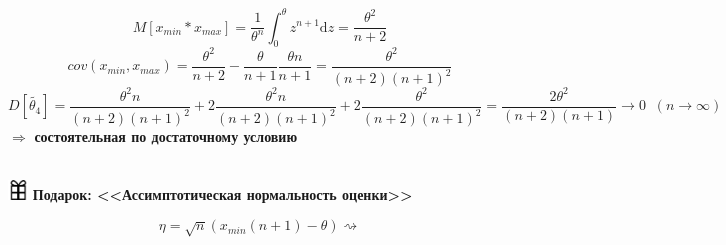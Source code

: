 \begin{equation*}  
    M\left[x_{min}*x_{max}\right]  = \frac{1}{\theta^n}\int_{0}^{\theta}z^{n+1}\mathrm{d}z
    = \frac{\theta^2}{n+2}
\end{equation*}
\vspace{1.5mm}
\begin{equation*}  
    cov(x_{min}, x_{max}) = \frac{\theta^2}{n+2} - \frac{\theta}{n+1}\frac{\theta n}{n+1} = \frac{\theta^2}{(n+2)(n+1)^2}
\end{equation*}
\vspace{1.5mm}
\begin{equation*}  
    D\left[\tilde{\theta_4}\right] =\frac{\theta^2n}{(n+2)(n+1)^2} +2\frac{\theta^2n}{(n+2)(n+1)^2} +2\frac{\theta^2}{(n+2)(n+1)^2}
    = \frac{2\theta^2}{(n+2)(n+1)} \to 0 \;\;\left(n\to\infty\right)
\end{equation*}
\vspace{1.5mm}
$\Rightarrow$ \textbf{состоятельная по достаточному условию}\\
\vspace{2.5mm}\\
\begin{flushleft}
    \includegraphics[width=0.04\textwidth]{images/present.png} 
    \textbf{Подарок: <<Ассимптотическая нормальность оценки>>}
\end{flushleft}
\begin{equation*}
   \eta = \sqrt{n}\left(x_{min}(n+1) - \theta\right) \rightsquigarrow
\end{equation*}



